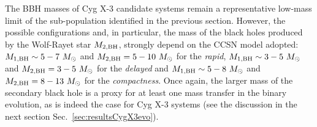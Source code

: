 \documentclass[a4paper,titlepage]{book}     	%
\newcommand{\sun}{\ensuremath{_\odot}}
\newcommand{\msun}{\ensuremath{M\sun}}
\begin{document}
The BBH masses of Cyg X-3 candidate systems remain a representative low-mass limit of the sub-population identified in the previous section. However, the possible configurations and, in particular, the mass of the black holes produced by the Wolf-Rayet star $M_{\rm 2, BH}$, strongly depend on the CCSN model adopted: $M_{\rm 1, BH} \sim 5-7~\msun$ and $M_{\rm 2, BH}=5-10~\msun$ for the \emph{rapid}, $M_{\rm 1, BH} \sim 3-5~\msun$ and $M_{\rm 2, BH}=3-5~\msun$ for the \emph{delayed} and $M_{\rm 1, BH} \sim 5-8~\msun$ and $M_{\rm 2, BH}=8-13~\msun$ for the \emph{compactness}. Once again, the larger mass of the secondary black hole is a proxy for at least one mass transfer in the binary evolution, as is indeed the case for Cyg X-3 systems (see the discussion in the next section Sec.\ \ref{sec:resultsCygX3evo}).


\clearpage
\end{document}
